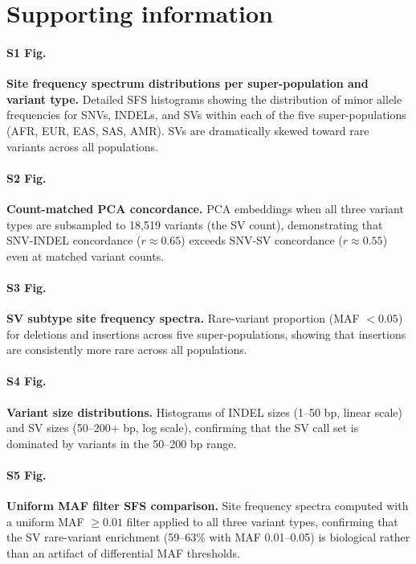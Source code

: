 \section*{Supporting information}

\paragraph*{S1 Fig.} \textbf{Site frequency spectrum distributions per super-population and variant type.} Detailed SFS histograms showing the distribution of minor allele frequencies for SNVs, INDELs, and SVs within each of the five super-populations (AFR, EUR, EAS, SAS, AMR). SVs are dramatically skewed toward rare variants across all populations.

\paragraph*{S2 Fig.} \textbf{Count-matched PCA concordance.} PCA embeddings when all three variant types are subsampled to 18,519 variants (the SV count), demonstrating that SNV-INDEL concordance ($r \approx 0.65$) exceeds SNV-SV concordance ($r \approx 0.55$) even at matched variant counts.

\paragraph*{S3 Fig.} \textbf{SV subtype site frequency spectra.} Rare-variant proportion (MAF $< 0.05$) for deletions and insertions across five super-populations, showing that insertions are consistently more rare across all populations.

\paragraph*{S4 Fig.} \textbf{Variant size distributions.} Histograms of INDEL sizes (1--50 bp, linear scale) and SV sizes (50--200+ bp, log scale), confirming that the SV call set is dominated by variants in the 50--200 bp range.

\paragraph*{S5 Fig.} \textbf{Uniform MAF filter SFS comparison.} Site frequency spectra computed with a uniform MAF $\geq 0.01$ filter applied to all three variant types, confirming that the SV rare-variant enrichment (59--63\% with MAF 0.01--0.05) is biological rather than an artifact of differential MAF thresholds.
